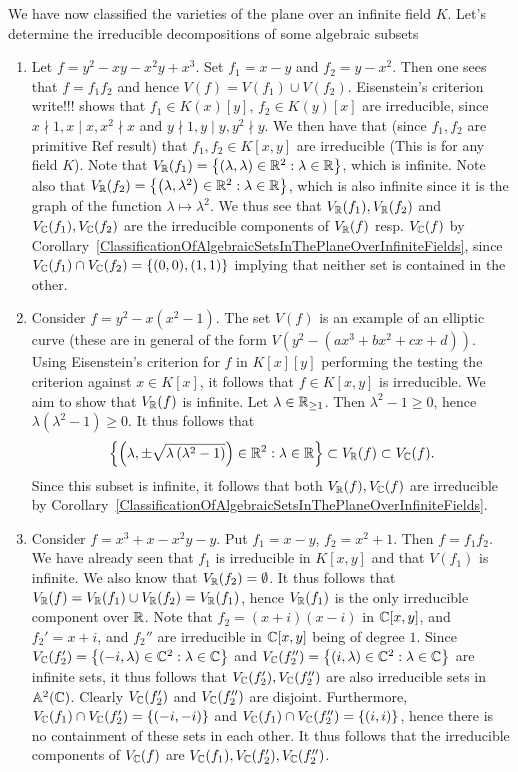 \begin{example}
    We have now classified the varieties of the plane over an infinite field $K$. Let's determine the irreducible decompositions of some algebraic subsets
    \begin{enumerate}
        \item Let $f = y^2-xy-x^2y+x^3$. Set $f_1=x-y$ and $f_2 = y-x^2$. Then one sees that $f=f_1f_2$ and hence $V(f)=V(f_1)\cup V(f_2)$. Eisenstein's criterion {\Large write!!!} shows that $f_1\in K(x)[y]$, $f_2\in K(y)[x]$ are irreducible, since $x\nmid 1, x\mid x, x^2\nmid x$ and $y\nmid 1, y\mid y, y^2\nmid y$. We then have that (since $f_1,f_2$ are primitive {\LARGE Ref result}) that $f_1,f_2\in K[x,y]$ are irreducible (This is for any field $K$). Note that $V_{\mathbb{R}}(f_1) = \left\{(\lambda,\lambda)\in \mathbb{R}^2: \lambda \in \mathbb{R}\right\}$, which is infinite. Note also that $V_{\mathbb{R}}(f_2)= \left\{ \left(\lambda,\lambda^2\right)\in \mathbb{R}^2 : \lambda \in \mathbb{R}\right\}$, which is also infinite since it is the graph of the function $\lambda \mapsto \lambda^2$. We thus see that $V_{\mathbb{R}}(f_1),V_{\mathbb{R}}(f_2)$ and $V_{\mathbb{C}}(f_1),V_{\mathbb{C}}(f_2)$ are the irreducible components of $V_{\mathbb{R}}(f)$ resp. $V_{\mathbb{C}}(f)$ by Corollary~\ref{ClassificationOfAlgebraicSetsInThePlaneOverInfiniteFields}, since $V_{\mathbb{C}}(f_1)\cap V_{\mathbb{C}}(f_2) = \{(0,0),(1,1)\}$ implying that neither set is contained in the other.
        \item Consider $f= y^2-x\left(x^2-1\right)$. The set $V(f)$ is an example of an elliptic curve (these are in general of the form $V\left(y^2-\left(ax^3+bx^2+cx+d\right)\right)$. Using Eisenstein's criterion for $f$ in $K[x][y]$ performing the testing the criterion against $x\in K[x]$, it follows that $f\in K[x,y]$ is irreducible. We aim to show that $V_{\mathbb{R}}(f)$ is infinite. Let $\lambda\in \mathbb{R}_{\geq 1}$. Then $\lambda^2-1\geq 0$, hence $\lambda\left(\lambda^2-1\right) \geq 0$. It thus follows that 
        $$\left\{ \left(\lambda,\pm \sqrt{\lambda\left(\lambda^2-1\right)} \right)\in \mathbb{R}^2 :\lambda \in \mathbb{R} \right\}\subset V_{\mathbb{R}}(f)\subset V_{\mathbb{C}}(f).$$
        Since this subset is infinite, it follows that both $V_{\mathbb{R}}(f),V_{\mathbb{C}}(f)$ are irreducible by Corollary~\ref{ClassificationOfAlgebraicSetsInThePlaneOverInfiniteFields}.
        \item Consider $f= x^3+x-x^2y-y$. Put $f_1= x-y$, $f_2=x^2+1$. Then $f= f_1f_2$. We have already seen that $f_1$ is irreducible in $K[x,y]$ and that $V(f_1)$ is infinite. We also know that $V_{\mathbb{R}}(f_2)=\emptyset$. It thus follows that $V_{\mathbb{R}}(f)=V_{\mathbb{R}}(f_1)\cup V_{\mathbb{R}}(f_2) = V_{\mathbb{R}}(f_1)$, hence $V_{\mathbb{R}}(f_1)$ is the only irreducible component over $\mathbb{R}$. Note that $f_2=(x+i)(x-i)$ in $\mathbb{C}[x,y]$, and $f_2'=x+i$, and $f_2''$ are irreducible in $\mathbb{C}[x,y]$ being of degree $1$. Since $V_{\mathbb{C}}(f_2')=\left\{(-i,\lambda)\in \mathbb{C}^2 : \lambda \in \mathbb{C}\right\}$ and $V_{\mathbb{C}}(f_2'')=\left\{(i,\lambda)\in \mathbb{C}^2 : \lambda \in \mathbb{C}\right\}$ are infinite sets, it thus follows that $V_{\mathbb{C}}(f_2'),V_{\mathbb{C}}(f_2'')$ are also irreducible sets in $\mathbb{A}^2(\mathbb{C})$. Clearly $V_{\mathbb{C}}(f_2')$ and $V_{\mathbb{C}}(f_2'')$ are disjoint. Furthermore, $V_{\mathbb{C}}(f_1)\cap V_{\mathbb{C}}(f_2') = \{(-i,-i)\}$ and $V_{\mathbb{C}}(f_1)\cap V_{\mathbb{C}}(f_2'') = \{(i,i)\}$, hence there is no containment of these sets in each other. It thus follows that the irreducible components of $V_{\mathbb{C}}(f)$ are $V_{\mathbb{C}}(f_1),V_{\mathbb{C}}(f_2'),V_{\mathbb{C}}(f_2'')$.

\end{enumerate}
\end{example}
